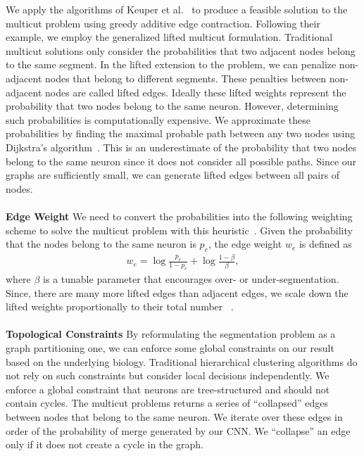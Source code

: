 We apply the algorithms of Keuper et al.~\cite{keuper2015efficient} to produce a feasible solution to the multicut problem using greedy additive edge contraction.
Following their example, we employ the generalized lifted multicut formulation.
Traditional multicut solutions only consider the probabilities that two adjacent nodes belong to the same segment. 
In the lifted extension to the problem, we can penalize non-adjacent nodes that belong to different segments. 
These penalties between non-adjacent nodes are called lifted edges. 
Ideally these lifted weights represent the probability that two nodes belong to the same neuron.
However, determining such probabilities is computationally expensive.
We approximate these probabilities by finding the maximal probable path between any two nodes using Dijkstra's algorithm~\cite{keuper2015efficient}.
This is an underestimate of the probability that two nodes belong to the same neuron since it does not consider all possible paths.
Since our graphs are sufficiently small, we can generate lifted edges between all pairs of nodes. 
\\~\\
\noindent\textbf{Edge Weight} 
We need to convert the probabilities into the following weighting scheme to solve the multicut problem with this heuristic~\cite{keuper2015efficient,andres2011probabilistic}.
Given the probability that the nodes belong to the same neuron is $p_e$, the edge weight $w_e$ is defined as
\begin{align}
w_e = \log{\frac{p_e}{1 - p_e}} + \log{\frac{1 - \beta}{\beta}},
\end{align}
where $\beta$ is a tunable parameter that encourages over- or under-segmentation. 
Since, there are many more lifted edges than adjacent edges, we scale down the lifted weights proportionally to their total number  
~\cite{beier2017multicut}.
\\~\\
\noindent\textbf{Topological Constraints}
By reformulating the segmentation problem as a graph partitioning one, we can enforce some global constraints on our result based on the underlying biology.
Traditional hierarchical clustering algorithms do not rely on such constraints but consider local decisions independently.
We enforce a global constraint that neurons are tree-structured and should not contain cycles. 
The multicut problems returns a series of ``collapsed'' edges between nodes that belong to the same neuron.
We iterate over these edges in order of the probability of merge generated by our CNN. 
We ``collapse'' an edge only if it does not create a cycle in the graph.
